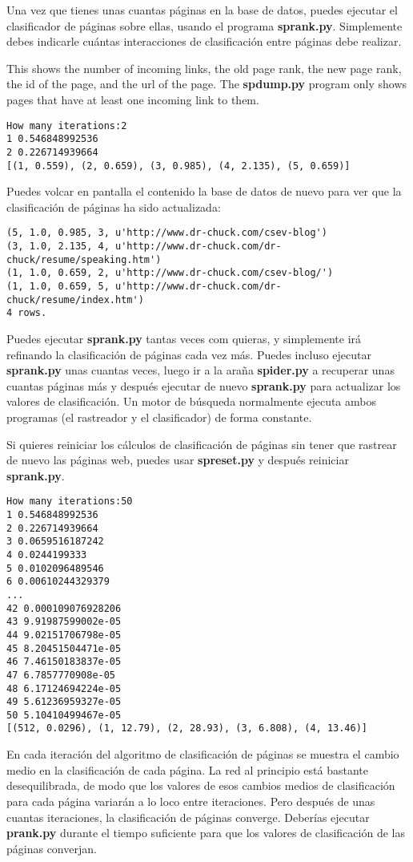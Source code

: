 Una vez que tienes unas cuantas páginas en la base de datos, puedes ejecutar el clasificador de
páginas sobre ellas, usando el programa {\bf sprank.py}. Simplemente debes indicarle cuántas
interacciones de clasificación entre páginas debe realizar.

This shows the number of incoming links, the old page rank, the new page
rank, the id of the page, and the url of the page.  The {\bf spdump.py} program
only shows pages that have at least one incoming link to them.

\beforeverb
\begin{verbatim}
How many iterations:2
1 0.546848992536
2 0.226714939664
[(1, 0.559), (2, 0.659), (3, 0.985), (4, 2.135), (5, 0.659)]
\end{verbatim}
\afterverb
%
Puedes volcar en pantalla el contenido la base de datos de nuevo para ver que la clasificación de
páginas ha sido actualizada:

\beforeverb
\begin{verbatim}
(5, 1.0, 0.985, 3, u'http://www.dr-chuck.com/csev-blog')
(3, 1.0, 2.135, 4, u'http://www.dr-chuck.com/dr-chuck/resume/speaking.htm')
(1, 1.0, 0.659, 2, u'http://www.dr-chuck.com/csev-blog/')
(1, 1.0, 0.659, 5, u'http://www.dr-chuck.com/dr-chuck/resume/index.htm')
4 rows.
\end{verbatim}
\afterverb
%
Puedes ejecutar {\bf sprank.py} tantas veces com quieras, y simplemente irá refinando
la clasificación de páginas cada vez más. Puedes incluso ejecutar {\bf sprank.py} unas cuantas veces,
luego ir a la araña {\bf spider.py} a recuperar unas cuantas páginas más y después ejecutar de nuevo
{\bf sprank.py} para actualizar los valores de clasificación. Un motor de búsqueda normalmente
ejecuta ambos programas (el rastreador y el clasificador) de forma constante.

Si quieres reiniciar los cálculos de clasificación de páginas sin tener que rastrear de nuevo
las páginas web, puedes usar {\bf spreset.py} y después reiniciar {\bf sprank.py}.

\beforeverb
\begin{verbatim}
How many iterations:50
1 0.546848992536
2 0.226714939664
3 0.0659516187242
4 0.0244199333
5 0.0102096489546
6 0.00610244329379
...
42 0.000109076928206
43 9.91987599002e-05
44 9.02151706798e-05
45 8.20451504471e-05
46 7.46150183837e-05
47 6.7857770908e-05
48 6.17124694224e-05
49 5.61236959327e-05
50 5.10410499467e-05
[(512, 0.0296), (1, 12.79), (2, 28.93), (3, 6.808), (4, 13.46)]
\end{verbatim}
\afterverb
%
En cada iteración del algoritmo de clasificación de páginas se muestra el cambio
medio en la clasificación de cada página. La red al principio está bastante
desequilibrada, de modo que los valores de esos cambios medios de clasificación
para cada página variarán a lo loco entre iteraciones. Pero después de unas cuantas
iteraciones, la clasificación de páginas converge. Deberías
ejecutar {\bf prank.py} durante el tiempo suficiente para que los valores de clasificación
de las páginas converjan.

